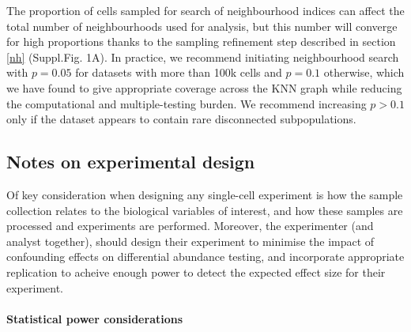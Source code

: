 \documentclass[
]{article}
\begin{document}
The proportion of cells sampled for search of neighbourhood indices can affect the total number of neighbourhoods used for analysis, but this number will converge for high proportions thanks to the sampling refinement step described in section \ref{nh} (Suppl.Fig. 1A). In practice, we recommend initiating neighbourhood search with \(p=0.05\) for datasets with more than 100k cells and \(p=0.1\) otherwise, which we have found to give appropriate coverage across the KNN graph while reducing the computational and multiple-testing burden. We recommend increasing \(p > 0.1\) only if the dataset appears to contain rare disconnected subpopulations.

\hypertarget{notes-on-experimental-design}{%
\subsection{Notes on experimental design}\label{notes-on-experimental-design}}

Of key consideration when designing any single-cell experiment is how the sample collection relates to the biological variables of interest, and how these samples
are processed and experiments are performed. Moreover, the experimenter (and analyst together), should design their experiment to minimise the impact of confounding
effects on differential abundance testing, and incorporate appropriate replication to acheive enough power to detect the expected effect size for their
experiment.

\hypertarget{statistical-power-considerations}{%
\paragraph*{Statistical power considerations}\label{statistical-power-considerations}}
\end{document}
